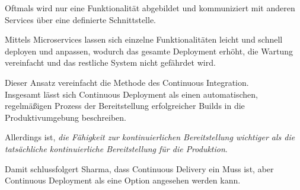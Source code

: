 Oftmals wird nur eine Funktionalität abgebildet und kommuniziert mit anderen Services über eine definierte Schnittstelle. 

Mittels Microservices lassen sich einzelne Funktionalitäten leicht und schnell deployen und anpassen, wodurch das gesamte Deployment erhöht, die Wartung vereinfacht und das restliche System nicht gefährdet wird. \cite[S. 85 - 86]{kim_devops-handbuch_2017}  

Dieser Ansatz vereinfacht die Methode des Continuous Integration. \\

Insgesamt lässt sich Continuous Deployment als einen automatischen, regelmäßigen Prozess der Bereitstellung erfolgreicher Builds in die Produktivumgebung beschreiben.

Allerdings ist, \textit{die Fähigkeit zur kontinuierlichen Bereitstellung wichtiger als die tatsächliche kontinuierliche Bereitstellung für die Produktion}. \cite[S. 19]{sharma_devops_2017}

Damit schlussfolgert Sharma, dass Continuous Delivery ein Muss ist, aber Continuous Deployment als eine Option angesehen werden kann.  






 











  











 






